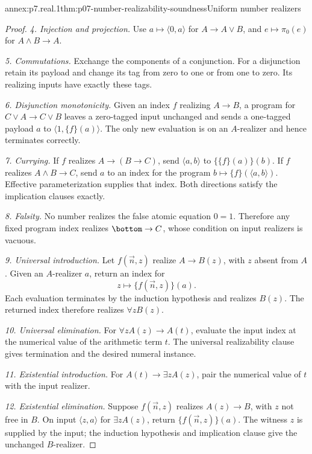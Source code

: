 \begin{annexitem}{annex:p7.real.1}{thm:p07-number-realizability-soundness}{Uniform number realizers}
\begin{proof}
\emph{4. Injection and projection.} Use
\(a\mapsto\langle0,a\rangle\) for \(A\to A\lor B\), and
\(e\mapsto\pi_0(e)\) for \(A\land B\to A\).

\emph{5. Commutations.} Exchange the components of a conjunction.
For a disjunction retain its payload and change its tag from zero to
one or from one to zero. Its realizing inputs have exactly these tags.

\emph{6. Disjunction monotonicity.} Given an index \(f\) realizing
\(A\to B\), a program for \(C\lor A\to C\lor B\) leaves
a zero-tagged input unchanged and sends a one-tagged payload \(a\)
to \(\langle1,\{f\}(a)\rangle\). The only new evaluation is
on an \(A\)-realizer and hence terminates correctly.

\emph{7. Currying.} If \(f\) realizes \(A\to(B\to C)\), send
\(\langle a,b\rangle\) to \(\{\{f\}(a)\}(b)\). If \(f\)
realizes \(A\land B\to C\), send \(a\) to an index for the
program \(b\mapsto\{f\}(\langle a,b\rangle)\). Effective
parameterization supplies that index. Both directions satisfy the
implication clauses exactly.

\emph{8. Falsity.} No number realizes the false atomic equation
\(0=1\). Therefore any fixed program index realizes
\(\bottom\to C\), whose condition on input realizers is vacuous.

\emph{9. Universal introduction.} Let \(f(\vec n,z)\) realize
\(A\to B(z)\), with \(z\) absent from \(A\). Given an
\(A\)-realizer \(a\), return an index for
\[
 z\longmapsto\{f(\vec n,z)\}(a).
\]
Each evaluation terminates by the induction hypothesis and realizes
\(B(z)\). The returned index therefore realizes \(\forall zB(z)\).

\emph{10. Universal elimination.} For
\(\forall zA(z)\to A(t)\), evaluate the input index at the
numerical value of the arithmetic term \(t\). The universal
realizability clause gives termination and the desired numeral instance.

\emph{11. Existential introduction.} For
\(A(t)\to\exists zA(z)\), pair the numerical value of \(t\)
with the input realizer.

\emph{12. Existential elimination.} Suppose
\(f(\vec n,z)\) realizes \(A(z)\to B\), with \(z\) not free
in \(B\). On input \(\langle z,a\rangle\) for
\(\exists zA(z)\), return \(\{f(\vec n,z)\}(a)\).
The witness \(z\) is supplied by the input; the induction hypothesis
and implication clause give the unchanged \(B\)-realizer.


\end{proof}
\end{annexitem}
